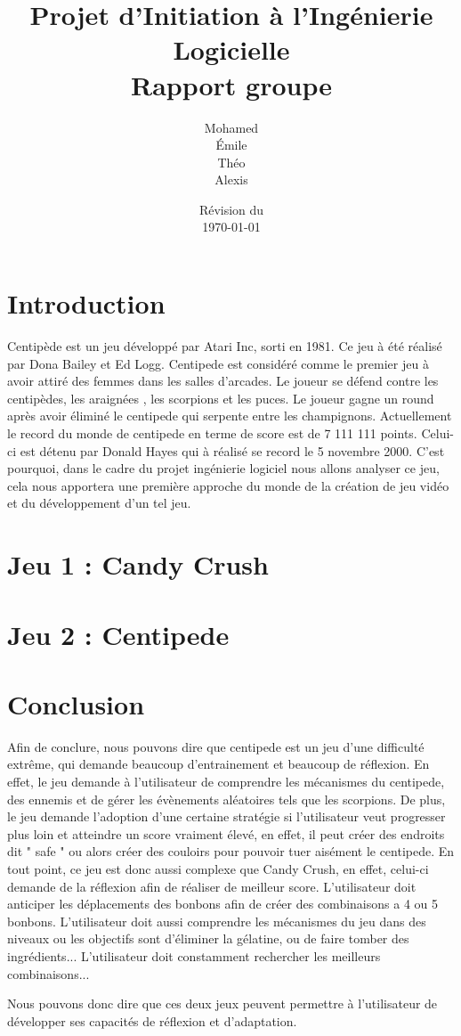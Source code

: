 \documentclass[a4paper, 12pt, twoside]{article}
\title{Projet d'Initiation à l'Ingénierie Logicielle\\Rapport groupe \no 3}
\author{Mohamed \bsc{Lakhal}\\Émile \bsc{Jeannin}\\Théo \bsc{Mottet}\\Alexis \bsc{Cabodi}}
\date{Révision du\\\today}
\begin{document}
\maketitle
\newpage
\tableofcontents
\newpage

\section{Introduction}
Centipède est un jeu développé par Atari Inc, sorti en 1981. Ce jeu à été réalisé par Dona Bailey et Ed Logg. Centipede est considéré comme le premier jeu à avoir attiré des femmes dans les salles d'arcades. 
Le joueur se défend contre les centipèdes, les araignées , les scorpions et les puces. Le joueur gagne un round après avoir éliminé le centipede qui serpente entre les champignons. Actuellement le record du monde de centipede en terme de score est de 7 111 111 points. Celui-ci est détenu par Donald Hayes qui à réalisé se record le 5 novembre 2000. 
C'est pourquoi, dans le cadre du projet ingénierie logiciel nous allons analyser ce jeu, cela nous apportera une première approche du monde de la création de jeu vidéo et du développement d'un tel jeu. 

\section{Jeu 1 : Candy Crush}


\section{Jeu 2 : Centipede}


\section{Conclusion}
Afin de conclure, nous pouvons dire que centipede est un jeu d'une difficulté extrême, qui demande beaucoup d'entrainement  et beaucoup de réflexion. En effet, le jeu demande à l'utilisateur de comprendre les mécanismes du centipede, des ennemis et de gérer les évènements aléatoires tels que les scorpions. De plus, le jeu demande l'adoption d'une certaine stratégie si l'utilisateur veut progresser plus loin et atteindre un score vraiment élevé, en effet, il peut créer des endroits dit " safe " ou alors créer des couloirs pour pouvoir tuer aisément le centipede. En tout point, ce jeu est donc aussi complexe que Candy Crush, en effet, celui-ci demande de la réflexion afin de réaliser de meilleur score. L'utilisateur doit anticiper les déplacements des bonbons afin de créer des combinaisons a 4 ou 5 bonbons. L'utilisateur doit aussi comprendre les mécanismes du jeu dans des niveaux ou les objectifs sont d'éliminer la gélatine, ou de faire tomber des ingrédients... L'utilisateur doit constamment rechercher les meilleurs combinaisons... 

Nous pouvons donc dire que ces deux jeux peuvent permettre à l'utilisateur de développer ses capacités de réflexion et d'adaptation.
\end{document}
